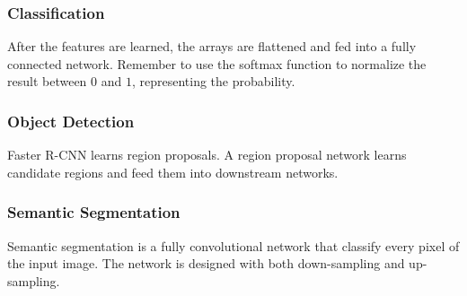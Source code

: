 \documentclass[12pt, a4paper, oneside]{article}
\begin{document}
\subsubsection{Classification}

After the features are learned, the arrays are flattened and fed into a fully connected network. Remember to use the softmax function to normalize the result between $0$ and $1$, representing the probability.

\subsubsection{Object Detection}

Faster R-CNN learns region proposals. A region proposal network learns candidate regions and feed them into downstream networks.

\subsubsection{Semantic Segmentation}

Semantic segmentation is a fully convolutional network that classify every pixel of the input image. The network is designed with both down-sampling and up-sampling.
\end{document}
